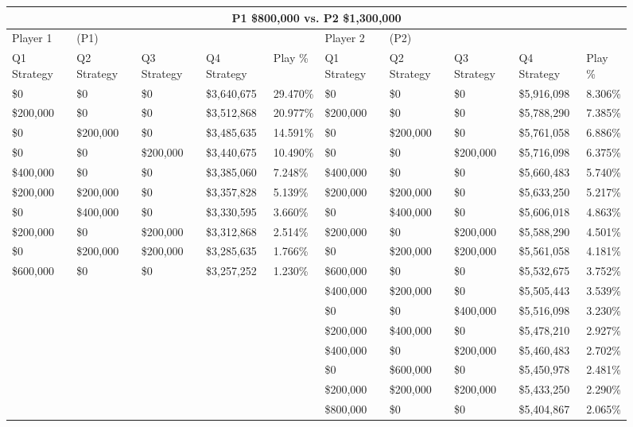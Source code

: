 \documentclass[11pt]{article}
\begin{document}
\begin{figure}
\tiny
\begin{tabular}{ |p{1.0cm}p{1.0cm}p{1.0cm}p{2.0cm}|p{1.0cm}||p{1.0cm}p{1.0cm}p{1.0cm}p{2.0cm}|p{1.0cm}|}
\hline
\multicolumn{10}{|c|}{P1 \$800,000 vs. P2 \$1,300,000} \\
\hline
Player 1 & (P1) & & & & Player 2 & (P2) & & & \\
\hline
Q1 Strategy & Q2 Strategy & Q3 Strategy & Q4 Strategy  &  Play \% & Q1 Strategy & Q2 Strategy & Q3 Strategy & Q4 Strategy  &  Play \%\\
\hline
\$0 & \$0 & \$0 & \$3,640,675 & 29.470\% & \$0 & \$0 & \$0 & \$5,916,098 & 8.306\% \\
\$200,000 & \$0 & \$0 & \$3,512,868 & 20.977\% & \$200,000 & \$0 & \$0 & \$5,788,290 & 7.385\% \\
\$0 & \$200,000 & \$0 & \$3,485,635 & 14.591\% & \$0 & \$200,000 & \$0 & \$5,761,058 & 6.886\% \\
\$0 & \$0 & \$200,000 & \$3,440,675 & 10.490\% & \$0 & \$0 & \$200,000 & \$5,716,098 & 6.375\% \\
\$400,000 & \$0 & \$0 & \$3,385,060 & 7.248\% & \$400,000 & \$0 & \$0 & \$5,660,483 & 5.740\% \\
\$200,000 & \$200,000 & \$0 & \$3,357,828 & 5.139\% & \$200,000 & \$200,000 & \$0 & \$5,633,250 & 5.217\% \\
\$0 & \$400,000 & \$0 & \$3,330,595 & 3.660\% & \$0 & \$400,000 & \$0 & \$5,606,018 & 4.863\% \\
\$200,000 & \$0 & \$200,000 & \$3,312,868 & 2.514\% & \$200,000 & \$0 & \$200,000 & \$5,588,290 & 4.501\% \\
\$0 & \$200,000 & \$200,000 & \$3,285,635 & 1.766\% & \$0 & \$200,000 & \$200,000 & \$5,561,058 & 4.181\% \\
\$600,000 & \$0 & \$0 & \$3,257,252 & 1.230\% & \$600,000 & \$0 & \$0 & \$5,532,675 & 3.752\% \\
&&&&&\$400,000 & \$200,000 & \$0 & \$5,505,443 & 3.539\% \\
&&&&&\$0 & \$0 & \$400,000 & \$5,516,098 & 3.230\% \\
&&&&&\$200,000 & \$400,000 & \$0 & \$5,478,210 & 2.927\% \\
&&&&&\$400,000 & \$0 & \$200,000 & \$5,460,483 & 2.702\% \\
&&&&&\$0 & \$600,000 & \$0 & \$5,450,978 & 2.481\% \\
&&&&&\$200,000 & \$200,000 & \$200,000 & \$5,433,250 & 2.290\% \\
&&&&&\$800,000 & \$0 & \$0 & \$5,404,867 & 2.065\% \\

\end{tabular}
\end{figure}
\end{document}
